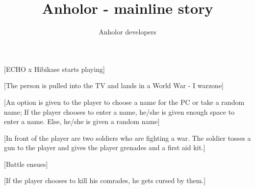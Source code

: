 \documentclass[a4paper,12pt]{report}
\title {Anholor - mainline story}
\author {Anholor developers}
\begin{document}
\newline

[ECHO x Hibikase starts playing]\newline

[The person is pulled into the TV and lands in a World War - I warzone]\newline

[An option is given to the player to choose a name for the PC or take a random name; If the player chooses to enter a name, he/she is given enough space to enter a name. Else, he/she is given a random name]\newline

[In front of the player are two soldiers who are fighting a war. The soldier tosses a gun to the player and gives the player grenades and a first aid kit.]\newline

[Battle ensues]\newline

[If the player chooses to kill his comrades, he gets cursed by them.]\newline
\end{document}
